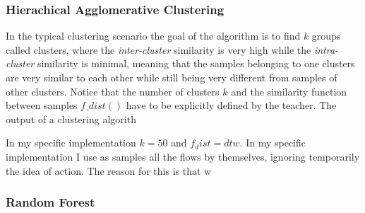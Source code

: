 \subsubsection{Hierachical Agglomerative Clustering}
In the typical clustering scenario the goal of the algorithm is to find $k$ groups called clusters, where the \textit{inter-cluster} similarity is very high while the \textit{intra-cluster} similarity is minimal, meaning that the samples belonging to one clusters are very similar to each other while still being very different from samples of other clusters. Notice that the number of clusters $k$ and the similarity function between samples $f\_dist()$ have to be explicitly defined by the teacher. The output of a clustering algorith 

In my specific implementation $k = 50$ and $f_dist = dtw$.
In my specific implementation I use as samples all the flows by themselves, ignoring temporarily the idea of action. The reason for this is that w
\subsubsection{Random Forest}
